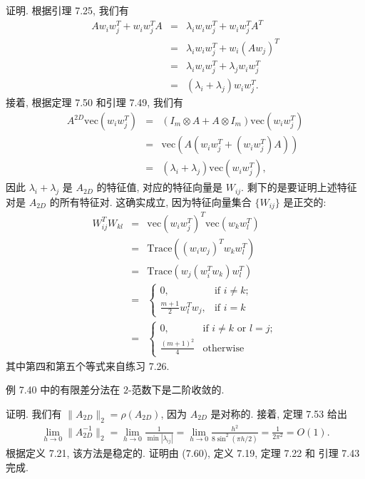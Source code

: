 \documentclass[a4paper]{ctexart}
\newcommand{\hl}[1]
{\noindent {\bf {#1}}}
\begin{document}
{证明. 根据引理 7.25, 我们有
\begin{eqnarray*}
A w_i w_j^T + w_i w_j^T A 
&=& \lambda_i w_i w_j^T + w_i w_j^T A^T \\ 
&=& \lambda_i w_i w_j^T + w_i (A w_j)^T \\
&=& \lambda_i w_i w_j^T + \lambda_j w_i w_j^T \\ 
&=& (\lambda_i + \lambda_j) w_i w_j^T. 
\end{eqnarray*}
接着, 根据定理 7.50 和引理 7.49, 我们有
\begin{eqnarray*}
A^{2D} \mathrm{vec} (w_i w_j^T) 
&=& (I_m \otimes A + A \otimes I_m) \mathrm{vec} (w_i w_j^T) \\
&=& \mathrm{vec} (A(w_i w_j^T + (w_i w_j^T)A)) \\ 
&=& (\lambda_i + \lambda_j) \mathrm{vec} (w_i w_j^T),
\end{eqnarray*}
因此 $\lambda_i + \lambda_j$ 是 $A_{2D}$ 的特征值, 
对应的特征向量是 $W_{ij}$.
剩下的是要证明上述特征对是 $A_{2D}$ 的所有特征对. 
这确实成立, 因为特征向量集合 $\{W_{ij}\}$ 是正交的:
\begin{eqnarray*}
W_{ij}^T W_{kl} 
&=& \mathrm{vec} (w_i w_j^T)^T \mathrm{vec} (w_k w_l^T)\\ 
&=& \mathrm{Trace} \left( (w_i w_j)^T w_k w_l^T \right)\\ 
&=& \mathrm{Trace} \left( w_j (w_i^T w_k) w_l^T \right)\\ 
&=& \begin{cases} 0, & \text{if } i \neq k; \\ 
  \frac{m + 1}{2} w_l^T w_j, & \text{if } i = k \end{cases}\\ 
&=& \begin{cases} 0, & \text{if } i \neq k \text{ or } l = j; \\ 
  \frac{(m+1)^2}{4}  & \text{otherwise} \end{cases} 
\end{eqnarray*}
其中第四和第五个等式来自练习 7.26.

\hl{定理7.54} 例 7.40 中的有限差分法在 $2$-范数下是二阶收敛的.

证明. 我们有 $\|A_{2D}\|_2 = \rho(A_{2D})$, 因为 $A_{2D}$ 是对称的.
接着, 定理 7.53 给出
\begin{eqnarray*}
\lim_{h \to 0} \|A^{-1}_{2D}\|_2 
= \lim_{h \to 0} \frac{1}{\min |\lambda_{ij}|} 
= \lim_{h \to 0} \frac{h^2}{8 \sin^2 (\pi h/2)} = \frac{1}{2\pi^2} = O(1).
\end{eqnarray*}
根据定义 7.21, 该方法是稳定的. 证明由 (7.60), 定义 7.19, 定理 7.22 和 引理 7.43 完成.

}
\end{document}
